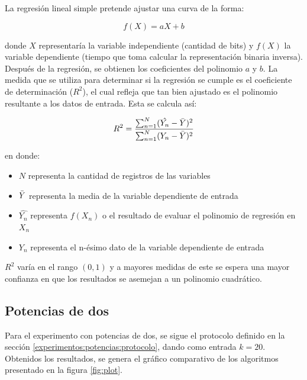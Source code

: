 \documentclass[letter]{article}
\begin{document}
La regresión lineal simple pretende ajustar una curva de la forma:

\[f(X) = aX + b \]

donde $X$ representaría la variable independiente (cantidad de bits) y $f(X)$ la variable dependiente (tiempo que toma calcular la representación binaria inversa). Después de la regresión, se obtienen los coeficientes del polinomio $a$ y $b$. La medida que se utiliza para determinar si la regresión se cumple es el coeficiente de determinación ($R^{2}$), el cual refleja que tan bien ajustado es el polinomio resultante a los datos de entrada. Esta se calcula así: \par

\[R^{2} = \frac{\sum_{n=1}^{N} (\hat{Y_n} - \Bar{Y})^2}{\sum_{n=1}^{N} (Y_n - \Bar{Y})^2} \]

en donde:

\begin{itemize}
    \item $N$ representa la cantidad de registros de las variables
    \item $\Bar{Y}$ representa la media de la variable dependiente de entrada
    \item $\hat{Y_n}$ representa $f(X_n)$ o el resultado de evaluar el polinomio de regresión en $X_n$
    \item $Y_n$ representa el n-ésimo dato de la variable dependiente de entrada
\end{itemize}

$R^2$ varía en el rango $(0,1)$ y a mayores medidas de este se espera una mayor confianza en que los resultados se asemejan a un polinomio cuadrático.\par

\subsection{Potencias de dos}

Para el experimento con potencias de dos, se sigue el protocolo definido en la sección \ref{experimentos:potencias:protocolo}, dando como entrada $k=20$. Obtenidos los resultados, se genera el gráfico comparativo de los algoritmos presentado en la figura \ref{fig:plot}. \par
\end{document}
